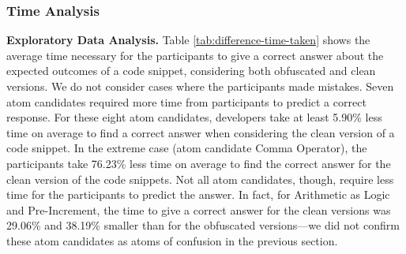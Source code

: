 

\subsubsection{Time Analysis}

{\bf Exploratory Data Analysis.}
Table \ref{tab:difference-time-taken} shows the average time necessary for the participants to give a correct answer about the expected outcomes of a code snippet, considering both obfuscated and clean versions. We do not consider cases where the participants made mistakes. Seven atom candidates required more time from participants to predict a correct response. For these eight atom candidates, developers take at least 5.90\% less time on average to find a correct answer when considering the clean version of a code snippet. In the extreme case (atom candidate Comma Operator), the participants take 76.23\% less
time on average to find the correct answer for the clean version of the code snippets. 
Not all atom candidates, though, require less time for the participants to predict the answer. In fact, for  Arithmetic as Logic and Pre-Increment, the time to give a correct answer for the clean versions was   
29.06\% and 38.19\% smaller than for the obfuscated versions---we did not confirm these atom candidates as atoms of confusion in the previous section.

